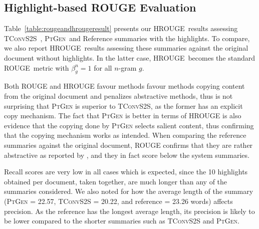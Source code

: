 \documentclass[11pt,a4paper]{article}
\newcommand\ptgen{\textsc{PtGen}}
\newcommand\tconv{\textsc{TConvS2S}}
\newcommand\hrouge{\textsc{HROUGE}}
\newcommand\rouge{\textsc{ROUGE}}
\begin{document}
\subsection{Highlight-based \rouge{} Evaluation} 

Table~\ref{table:rougeandhrougeresult} presents our \hrouge\ results assessing \tconv\ , \ptgen\  and Reference summaries with the highlights. To compare, we also report \hrouge\ results assessing these summaries against the original document without highlights. In the latter case, \hrouge\ becomes the standard \rouge\ metric with $\beta^n_g=1$ for all $n$-gram $g$. 

Both \rouge{} and \hrouge{} favour methods favour methods copying content from the original document and penalizes abstractive methods, thus is not surprising that \ptgen{} is superior to \tconv{}, as the former has an explicit copy mechanism. The fact that \ptgen{} is better in terms of \hrouge{} is also evidence that the copying done by \ptgen{} selects salient content, thus confirming that the copying mechanism works as intended. 
When comparing the reference summaries against the original document, \rouge{} confirms that they are rather abstractive as reported by \citet{narayan18xsum}, and they in fact score below the system summaries. 


Recall scores are very low in all cases which is expected, since the 10 highlights obtained per document, taken together, are much longer than any of the summaries considered. We also noted for how the average length of the summary (\ptgen{} = 22.57, \tconv{} = 20.22, and reference = 23.26 words) affects precision. As the reference has the longest average length, its precision is likely to be lower compared to the shorter summaries such as \tconv{} and \ptgen{}.
\end{document}
